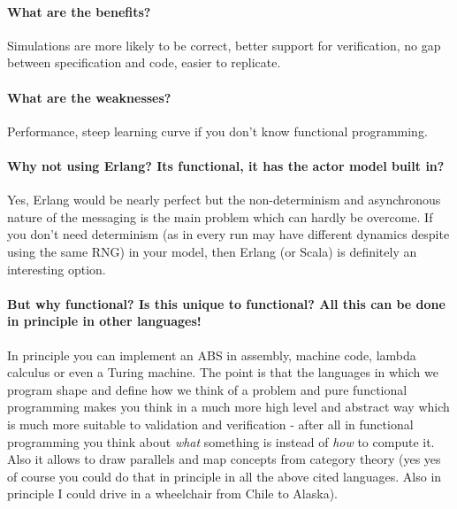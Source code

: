 \paragraph{What are the benefits?}
Simulations are more likely to be correct, better support for verification, no gap between specification and code, easier to replicate.

\paragraph{What are the weaknesses?}
Performance, steep learning curve if you don't know functional programming.

\paragraph{Why not using Erlang? Its functional, it has the actor model built in?}
Yes, Erlang would be nearly perfect but the non-determinism and asynchronous nature of the messaging is the main problem which can hardly be overcome. If you don't need determinism (as in every run may have different dynamics despite using the same RNG) in your model, then Erlang (or Scala) is definitely an interesting option.

\paragraph{But why functional? Is this unique to functional? All this can be done in principle in other languages!}
In principle you can implement an ABS in assembly, machine code, lambda calculus or even a Turing machine. The point is that the languages in which we program shape and define how we think of a problem and pure functional programming makes you think in a much more high level and abstract way which is much more suitable to validation and verification - after all in functional programming you think about \textit{what} something is instead of \textit{how} to compute it. Also it allows to draw parallels and map concepts from category theory (yes yes of course you could do that in principle in all the above cited languages. Also in principle I could drive in a wheelchair from Chile to Alaska).

